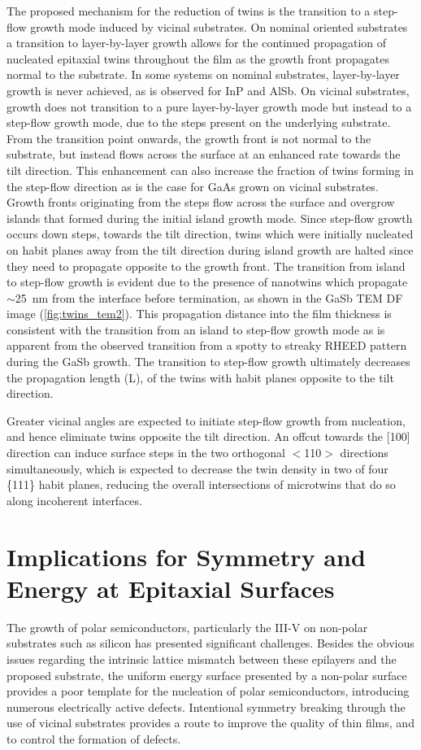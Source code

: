 The proposed mechanism for the reduction of twins is the transition to a step-flow growth mode induced by vicinal substrates.
On nominal oriented substrates a transition to layer-by-layer growth allows for the continued propagation of nucleated epitaxial twins throughout the film as the growth front propagates normal to the substrate.
In some systems on nominal substrates, layer-by-layer growth is never achieved, as is observed for InP and AlSb.
On vicinal substrates, growth does not transition to a pure layer-by-layer growth mode but instead to a step-flow growth mode, due to the steps present on the underlying substrate.
From the transition point onwards, the growth front is not normal to the substrate, but instead flows across the surface at an enhanced rate towards the tilt direction.
This enhancement can also increase the fraction of twins forming in the step-flow direction as is the case for GaAs grown on vicinal substrates.
Growth fronts originating from the steps flow across the surface and overgrow islands that formed during the initial island growth mode.
Since step-flow growth occurs down steps, towards the tilt direction, twins which were initially nucleated on habit planes away from the tilt direction during island growth are halted since they need to propagate opposite to the growth front.
The transition from island to step-flow growth is evident due to the presence of nanotwins which propagate \(\sim\)25~nm from the interface before termination, as shown in the GaSb TEM DF image (\cref{fig:twins_tem2}).
This propagation distance into the film thickness is consistent with the transition from an island to step-flow growth mode as is apparent from the observed transition from a spotty to streaky RHEED pattern during the GaSb growth.
The transition to step-flow growth ultimately decreases the propagation length (L), of the twins with habit planes opposite to the tilt direction.

Greater vicinal angles are expected to initiate step-flow growth from nucleation, and hence eliminate twins opposite the tilt direction.
An offcut towards the [100] direction can induce surface steps in the two orthogonal \(<\)110\(>\) directions simultaneously\cite{Fang1990}, which is expected to decrease the twin density in two of four \{111\} habit planes, reducing the overall intersections of microtwins that do so along incoherent interfaces.
\section{Implications for Symmetry and Energy at Epitaxial Surfaces}
The growth of polar semiconductors, particularly the III-V on non-polar substrates such as silicon has presented significant challenges.
Besides the obvious issues regarding the intrinsic lattice mismatch between these epilayers and the proposed substrate, the uniform energy surface presented by a non-polar surface provides a poor template for the nucleation of polar semiconductors, introducing numerous electrically active defects.
Intentional symmetry breaking through the use of vicinal substrates provides a route to improve the quality of thin films, and to control the formation of defects.

